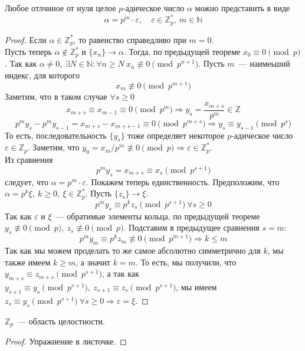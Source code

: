 \documentclass[11pt]{article}
\begin{document}
    \begin{theorem}
        Любое отлчиное от нуля целое $p$-адическое число $\alpha$ можно представить в виде
        \[ \alpha = p^m \cdot \varepsilon, \quad \varepsilon \in \mathbb{Z}_p^{*}, \ m \in \mathbb{N} \]

    \end{theorem}
    \begin{proof}
        Если $\alpha \in \mathbb{Z}_p^{*}$, то равенство справедливо при $m = 0$.\\
        Пусть теперь $\alpha \notin \mathbb{Z}_p^{*}$ и $\{ x_n \} \to \alpha$. Тогда, по предыдущей теореме
        $x_0 \equiv 0 \pmod{p}$. Так как $\alpha \neq 0, \ \exists N \in \mathbb{N}\colon \forall n \ge N \ x_n \not\equiv 0 \pmod{p^{n + 1}}$.
        Пусть $m$~--- наимеьший индекс, для которого
        \[ x_m \not\equiv 0 \pmod{p^{m + 1}}\]
        Заметим, что в таком случае $\forall s \ge 0$
        \[ x_{m + s} \equiv x_{m - 1} \equiv 0 \pmod{p^{m}} \Rightarrow y_s = \frac{x_{m + s}}{p^m} \in \mathbb{Z} \]
        \[ p^m y_s - p^m y_{s - 1}  = x_{m + s} - x_{m + s - 1} \equiv 0 \pmod{p^{m + s}} \Rightarrow y_s \equiv y_{s - 1} \pmod{p^s}\]
        То есть, последовательность $\{ y_s \}$ тоже определяет некоторое $p$-адическое число $\varepsilon \in \mathbb{Z}_p$.
        Заметим, что $y_0 = x_m/p^m \not\equiv 0 \pmod{p} \Rightarrow \varepsilon \in \mathbb{Z}_p^{*}$.\\
        Из сравнения
        \[ p^m y_s = x_{m + s} \equiv x_s \pmod{p^{s + 1}} \]
        следует, что $\alpha = p^m \cdot \varepsilon$.
        Покажем теперь единственность. Предположим, что $\alpha = p^k \xi, \ k \ge 0, \ \xi \in \mathbb{Z}_{p}^{*}$. Пусть $\{ z_s \} \to \xi$.
        \[ p^m y_s \equiv p^k z_s \pmod{p^{s + 1}} \ \forall s \ge 0 \]
        Так как $\varepsilon$ и $\xi$~--- обратимые элементы кольца, по предыдущей теореме $y_s \not\equiv 0 \pmod{p}, \ z_s \not\equiv 0 \pmod{p}$.
        Подставим в предыдущее сравнения $s = m$:
        \[ p^m y_m \equiv p^k z_m \not\equiv 0 \pmod{p^{m + 1}} \Rightarrow k \le m \]
        Так как мы можем проделать то же самое абсолютно симметрично для $k$, мы также имеем $k \ge m$, а значит
        $k = m$.
        То есть, мы получили, что $y_{m + s} \equiv z_{m + s} \pmod{p^{s + 1}}$, а так как $y_{s + 1} \equiv y_s \pmod{p^{s + 1}}, \ z_{s + 1} \equiv z_s \pmod{p^{s + 1}}$,
        мы имеем $z_s \equiv y_s \pmod{p^{s + 1}} \ \forall s \ge 0 \Rightarrow \varepsilon = \xi$.
    \end{proof}
    \begin{corollary}
        $\mathbb{Z}_p$~--- область целостности.
     \end{corollary}
    \begin{proof}
        Упражнение в листочке.
    \end{proof}
\end{document}
